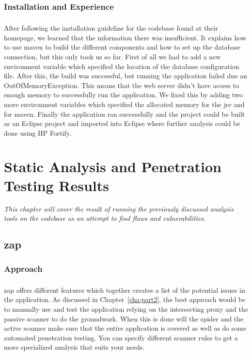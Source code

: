 \documentclass[11pt,english,a4paper]{report}
\begin{document}
\subsection{Installation and Experience}
\paragraph{}
After following the installation guideline for the codebase found at their homepage, we learned that the information there was insufficient.
It explains how to use \gls{maven} to build the different components and how to set up the database connection, but this only took us so far.
First of all we had to add a new environment variable which specified the location of the database configuration file.
After this, the build was successful, but running the application failed due an OutOfMemoryException. 
This means that the web server didn't have access to enough memory to successfully run the application. 
We fixed this by adding two more environment variables which specified the allocated memory for the \gls{jre} and for \gls{maven}.
Finally the application ran successfully and the project could be built as an Eclipse project and imported into Eclipse where further analysis could be done using HP Fortify.




\chapter{Static Analysis and Penetration Testing Results}
\textit{This chapter will cover the result of running the previously discussed analysis tools on the codebase as an attempt to find flaws and vulnerabilities.}

\section{\gls{zap}}
\subsection{Approach}
\paragraph{}
\gls{zap} offers different features which together creates a list of the potential issues in the application. 
As discussed in Chapter~\ref{cha:part2}, the best approach would be to manually use and test the application relying on the intersecting proxy and the passive scanner to do the groundwork. 
When this is done will the spider and the active scanner make sure that the entire application is covered as well as do some automated penetration testing. 
You can specify different scanner rules to get a more specialized analysis that suits your needs.
\end{document}
